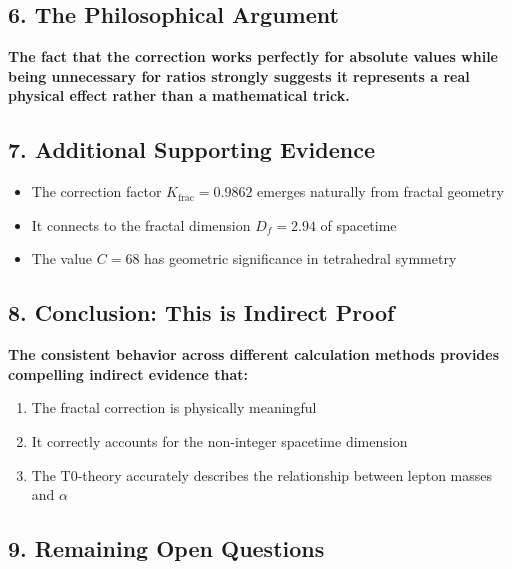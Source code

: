\documentclass[12pt,a4paper]{article}
\theoremstyle{definition}
\begin{document}
\subsection*{6. The Philosophical Argument}

\begin{tcolorbox}[colback=blue!5!white,colframe=blue!75!black]
	\textbf{The fact that the correction works perfectly for absolute values while being unnecessary for ratios strongly suggests it represents a real physical effect rather than a mathematical trick.}
\end{tcolorbox}

\subsection*{7. Additional Supporting Evidence}

\begin{itemize}
	\item The correction factor $K_{\text{frac}} = 0.9862$ emerges naturally from fractal geometry
	\item It connects to the fractal dimension $D_f = 2.94$ of spacetime
	\item The value $C = 68$ has geometric significance in tetrahedral symmetry
\end{itemize}

\subsection*{8. Conclusion: This is Indirect Proof}

\begin{tcolorbox}[colback=red!5!white,colframe=red!75!black]
	\textbf{The consistent behavior across different calculation methods provides compelling indirect evidence that:}
	\begin{enumerate}
		\item The fractal correction is physically meaningful
		\item It correctly accounts for the non-integer spacetime dimension
		\item The T0-theory accurately describes the relationship between lepton masses and $\alpha$
	\end{enumerate}
\end{tcolorbox}

\subsection*{9. Remaining Open Questions}
\end{document}
